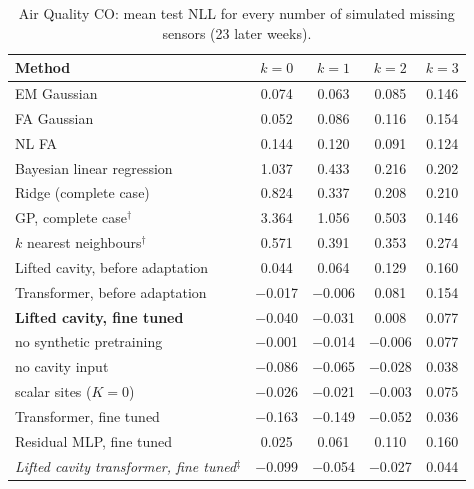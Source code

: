 \begin{table}[t]
\centering\small
\caption{\label{tab:moreairqco}Air Quality CO: mean test NLL for every number of simulated missing sensors (23 later weeks).}
\begin{tabular}{lcccc}
\toprule
Method & $k{=}0$ & $k{=}1$ & $k{=}2$ & $k{=}3$\\
\midrule
EM Gaussian & 0.074 & 0.063 & 0.085 & 0.146\\
FA Gaussian & 0.052 & 0.086 & 0.116 & 0.154\\
NL FA & 0.144 & 0.120 & 0.091 & 0.124\\
Bayesian linear regression & 1.037 & 0.433 & 0.216 & 0.202\\
Ridge (complete case) & 0.824 & 0.337 & 0.208 & 0.210\\
GP, complete case$^\dagger$ & 3.364 & 1.056 & 0.503 & 0.146\\
$k$ nearest neighbours$^\dagger$ & 0.571 & 0.391 & 0.353 & 0.274\\
Lifted cavity, before adaptation & 0.044 & 0.064 & 0.129 & 0.160\\
Transformer, before adaptation & $-$0.017 & $-$0.006 & 0.081 & 0.154\\
\textbf{Lifted cavity, fine tuned} & $-$0.040 & $-$0.031 & 0.008 & 0.077\\
\quad no synthetic pretraining & $-$0.001 & $-$0.014 & $-$0.006 & 0.077\\
\quad no cavity input & $-$0.086 & $-$0.065 & $-$0.028 & 0.038\\
\quad scalar sites ($K=0$) & $-$0.026 & $-$0.021 & $-$0.003 & 0.075\\
Transformer, fine tuned & $-$0.163 & $-$0.149 & $-$0.052 & 0.036\\
Residual MLP, fine tuned & 0.025 & 0.061 & 0.110 & 0.160\\
\emph{Lifted cavity transformer, fine tuned}$^\ddagger$ & $-$0.099 & $-$0.054 & $-$0.027 & 0.044\\
\bottomrule
\end{tabular}
\end{table}

